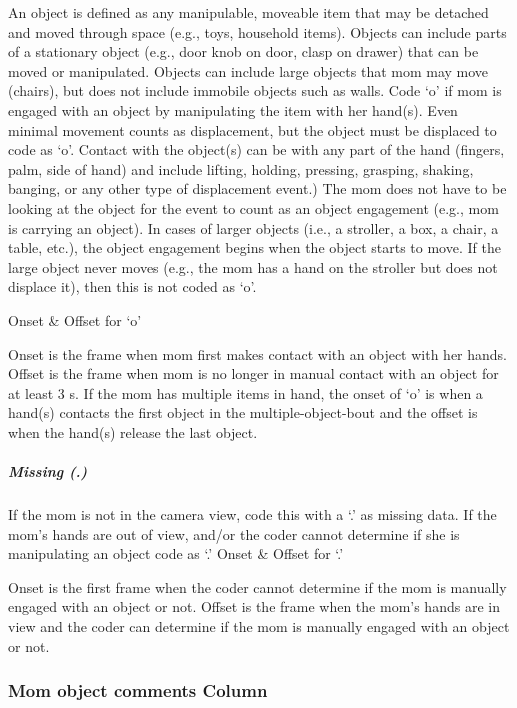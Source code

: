 \documentclass[
]{book}
\begin{document}
An object is defined as any manipulable, moveable item that may be detached and moved through space (e.g., toys, household items). Objects can include parts of a stationary object (e.g., door knob on door, clasp on drawer) that can be moved or manipulated. Objects can include large objects that mom may move (chairs), but does not include immobile objects such as walls. Code `o' if mom is engaged with an object by manipulating the item with her hand(s). Even minimal movement counts as displacement, but the object must be displaced to code as `o'. Contact with the object(s) can be with any part of the hand (fingers, palm, side of hand) and include lifting, holding, pressing, grasping, shaking, banging, or any other type of displacement event.) The mom does not have to be looking at the object for the event to count as an object engagement (e.g., mom is carrying an object).
In cases of larger objects (i.e., a stroller, a box, a chair, a table, etc.), the object engagement begins when the object starts to move. If the large object never moves (e.g., the mom has a hand on the stroller but does not displace it), then this is not coded as `o'.

Onset \& Offset for `o'

Onset is the frame when mom first makes contact with an object with her hands.
Offset is the frame when mom is no longer in manual contact with an object for at least 3 s. If the mom has multiple items in hand, the onset of `o' is when a hand(s) contacts the first object in the multiple-object-bout and the offset is when the hand(s) release the last object.

\hypertarget{mom_hands_off_camera}{%
\subparagraph*{Missing (.)}\label{mom_hands_off_camera}}

If the mom is not in the camera view, code this with a `.' as missing data. If the mom's hands are out of view, and/or the coder cannot determine if she is manipulating an object code as `.'
Onset \& Offset for `.'

Onset is the first frame when the coder cannot determine if the mom is manually engaged with an object or not.
Offset is the frame when the mom's hands are in view and the coder can determine if the mom is manually engaged with an object or not.

\hypertarget{mom-object-comments-column}{%
\subsubsection*{Mom object comments Column}\label{mom-object-comments-column}}
\end{document}
